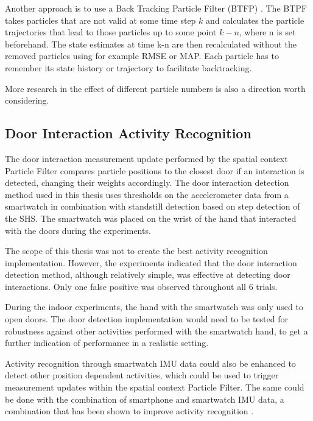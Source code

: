 Another approach is to use a Back Tracking Particle Filter (BTFP) . The BTPF takes particles that are not valid at some time step $ k $ and calculates the particle trajectories that lead to those particles up to some point $ k - n $, where n is set beforehand. The state estimates at time k-n are then recalculated without the removed particles using for example RMSE or MAP. Each particle has to remember its state history or trajectory to facilitate backtracking. 

More research in the effect of different particle numbers is also a direction worth considering.

\subsection{Door Interaction Activity Recognition}

The door interaction measurement update performed by the spatial context Particle Filter compares particle positions to the closest door if an interaction is detected, changing their weights accordingly. The door interaction detection method used in this thesis uses thresholds on the accelerometer data from a smartwatch in combination with standstill detection based on step detection of the \ac{SHS}. The smartwatch was placed on the wrist of the hand that interacted with the doors during the experiments.\par 

The scope of this thesis was not to create the best activity recognition implementation. However, the experiments indicated that the door interaction detection method, although relatively simple, was effective at detecting door interactions. Only one false positive was observed throughout all 6 trials. \par 

During the indoor experiments, the hand with the smartwatch was only used to open doors. The door detection implementation would need to be tested for robustness against other activities performed with the smartwatch hand, to get a further indication of performance in a realistic setting. \par 

Activity recognition through smartwatch IMU data could also be enhanced to detect other position dependent activities, which could be used to trigger measurement updates within the spatial context Particle Filter. The same could be  done with the combination of smartphone and smartwatch IMU data, a combination that has been shown to improve activity recognition \cite{Shoaib2016}.

